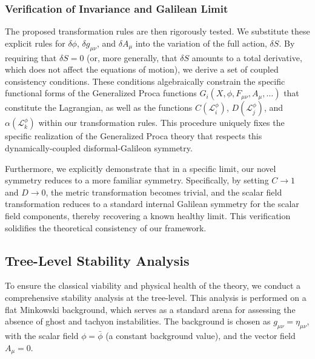 \documentclass[twocolumn]{aastex631}
\begin{document}
\begin{itemize}
\subsubsection{Verification of Invariance and Galilean Limit}
The proposed transformation rules are then rigorously tested. We substitute these explicit rules for $\delta \phi$, $\delta g_{\mu\nu}$, and $\delta A_\mu$ into the variation of the full action, $\delta S$. By requiring that $\delta S = 0$ (or, more generally, that $\delta S$ amounts to a total derivative, which does not affect the equations of motion), we derive a set of coupled consistency conditions. These conditions algebraically constrain the specific functional forms of the Generalized Proca functions $G_i(X, \phi, F_{\mu\nu}, A_\mu, \dots)$ that constitute the Lagrangian, as well as the functions $C(\mathcal{L}_i^\phi)$, $D(\mathcal{L}_j^\phi)$, and $\alpha(\mathcal{L}_k^\phi)$ within our transformation rules. This procedure uniquely fixes the specific realization of the Generalized Proca theory that respects this dynamically-coupled disformal-Galileon symmetry.

Furthermore, we explicitly demonstrate that in a specific limit, our novel symmetry reduces to a more familiar symmetry. Specifically, by setting $C \to 1$ and $D \to 0$, the metric transformation becomes trivial, and the scalar field transformation reduces to a standard internal Galilean symmetry for the scalar field components, thereby recovering a known healthy limit. This verification solidifies the theoretical consistency of our framework.

\subsection{Tree-Level Stability Analysis}

To ensure the classical viability and physical health of the theory, we conduct a comprehensive stability analysis at the tree-level. This analysis is performed on a flat Minkowski background, which serves as a standard arena for assessing the absence of ghost and tachyon instabilities. The background is chosen as $g_{\mu\nu} = \eta_{\mu\nu}$, with the scalar field $\phi = \bar{\phi}$ (a constant background value), and the vector field $A_\mu = 0$.


\end{itemize}
\end{document}
